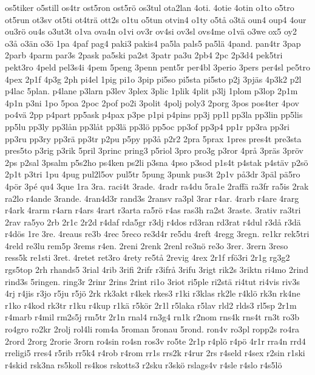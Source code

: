 {os5tiker
o5still
os4tr
ost5ron
ost5r^^f6
os3tul
ota2lan
4oti.
4otie
4otin
o1to
o5tro
ot5run
ot3sv
ot5ti
ot4tr^^e4
ott2s
o1tu
o5tun
otvin4
o1ty
o5t^^e5
o3t^^e4
oun4
oup4
4our
ou3r^^f6
ou4s
o3ut3t
o1va
ova4n
o1vi
ov3r
ov4si
ov3sl
ovs4me
o1v^^e4
o3we
ox5
oy2
o3^^e5
o3^^e4n
o3^^f6
1pa
4paf
pag4
paki3
pakis4
pa5la
pals5
pa5l^^e4
4pand.
pan4tr
3pap
2parb
4parm
par3s
2pask
pa5ski
pa2st
3patr
pa3u
2pb4
2pc
2p3d4
pek5tri
pekt3ro
4peld
pel3s4i
4pem
5peng
3penn
pent5r
per4bl
3perio
3pers
per4sl
pe5tro
4pex
2p1f
4p3g
2ph
pi4el
1pig
pi1o
3pip
pi5so
pi5sta
pi5sto
p2j
3pj^^e4s
4p3k2
p2l
p4lac
5plan.
p4lane
p3larn
p3lev
3plex
3plic
1plik
4plit
p3lj
1plom
p3lop
2p1m
4p1n
p3ni
1po
5poa
2poc
2pof
po2i
3polit
4polj
poly3
2porg
3pos
pos4ter
4pov
po4v^^e4
2pp
p4part
pp5ask
p4pax
p3pe
p1pi
p4pins
pp3j
pp1l
pp3la
pp3lin
pp5lis
pp5lu
pp3ly
pp3l^^e5n
pp3l^^e5t
pp3l^^e4
pp3l^^f6
pp5oc
pp3of
pp3p4
pp1r
pp3ra
pp3ri
pp3ru
pp3ry
pp3r^^e4
pp3tr
p2pu
p5py
pp3^^e5
p2r2
2pra
5prax
1pres
pres4t
pre3sta
pres5to
p3rig
p3rik
5pril
3princ
pring3
p5riol
3pro
pro3g
p3ror
4pr^^e5
3pr^^e4s
3pr^^f6v
2ps
p2sal
3psalm
p5s2ho
ps4ken
ps2li
p3sna
4pso
p3sod
p1s4t
p4stak
p4st^^e4v
p2s^^f6
2p1t
p3tri
1pu
4pug
pul2l5ov
pul5tr
5pung
3punk
pus3t
2p1v
p^^e53dr
3p^^e4l
p^^e45ro
4p^^f6r
3p^^e9
qu4
3que
1ra
3ra.
raci4t
3rade.
4radr
ra4du
5ra1e
2raff^^e4
ra3fr
ra5is
2rak
ra2lo
r4ande
3rande.
4ran4d3r
rand3s
2ransv
ra3pl
3rar
r4ar.
4rarb
r4are
4rarg
r4ark
4rarm
r4arn
r4ars
4rart
r3arta
ra5r^^f6
r4as
ras3h
ra2st
3raste.
3rativ
ra3tri
2rav
ra5yo
2rb
2r1c
2r2d
r4daf
rda5gr
r3dj
r4dos
rd3ran
rd3rat
r4dul
r3d^^e5
r3d^^e4
r4d^^f6s
1re
3re.
4reaus
re3b
4rec
5reco
re3d4r
re5du
4reft
4regg
3regn.
re1kr
rek5tri
4reld
re3lu
rem5p
3rems
r4en.
2reni
2renk
2renl
re3n^^f6
re3o
3rer.
3rern
3reso
ress5k
re1sti
3ret.
4retet
ret3ro
4rety
re5t^^e5
2revig
4rex
2r1f
rf^^f63ri
2r1g
rg3g2
rgs5top
2rh
rhands5
3rial
4rib
3rifi
2rifr
r3ifr^^e5
3rifu
3rigt
rik2s
3riktn
ri4mo
2rind
rind3s
5ringen.
ring3r
2rinr
2rins
2rint
ri1o
3riot
ri5ple
ri2st^^e4
ri4tut
ri4vis
riv3s
4rj
r4jis
r3jo
r5ju
r5j^^f6
2rk
rk3akt
r4kek
rkes3
r1ki
r3klas
rk2le
r4kl^^f6
rk3n
rk4ne
r1ko
r4kod
rk3tr
r1ku
r4kup
r1k^^e4
r5k^^f6r
2r1l
r5laka
r5lav
rld2
rlds3
rl5sp
2r1m
r4marb
r4mil
rm2s5j
rm5tr
2r1n
rnal4
rn3g4
rn1k
r2nom
rns4k
rns4t
rn3t
ro3b
ro4gro
ro2kr
2rolj
rol4li
rom4a
5roman
5ronau
5rond.
ron4v
ro3pl
ropp2s
ro4ra
2rord
2rorg
2rorie
3rorn
ro4sin
ro4sn
ros3v
ro5te
2r1p
r4pl^^f6
r4p^^f6
4r1r
rra4n
rrd4
rreligi5
rres4
r5rib
rr5k4
r4rob
r4rom
rr1s
rrs2k
r4rur
2rs
r4seld
r4sex
r2sin
r1ski
r4skid
rsk3na
rs5koll
rs4kos
rskotts3
r2sku
r3sk^^f6
rslags4v
r4sle
r4slo
r4s5l^^f6
}
